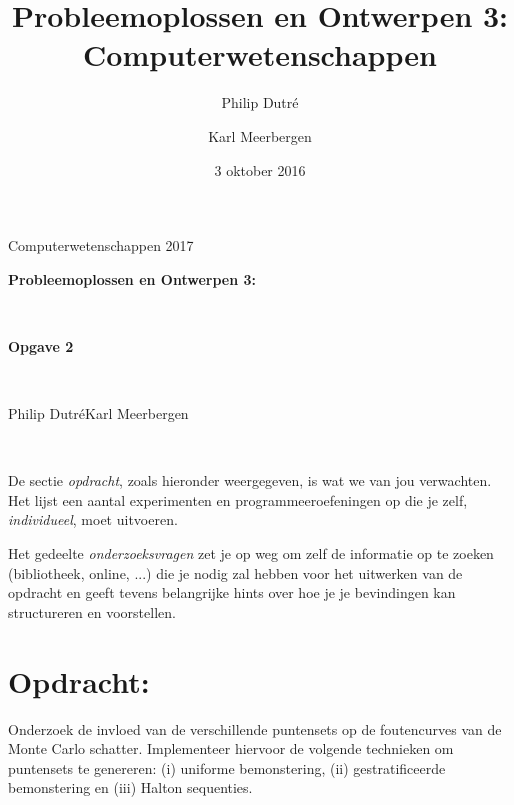\documentclass[10pt,a4paper]{article}
\title{Probleemoplossen en Ontwerpen 3: Computerwetenschappen}
\author{Philip Dutr\'e \and Karl Meerbergen}
\date{3 oktober 2016}
\begin{document}
\begin{flushright}
	Computerwetenschappen 2017\\[1cm]
\end{flushright}
\begin{center}%
	\begin{huge}
		\textbf{Probleemoplossen en Ontwerpen 3:}
	\end{huge}\\[0.25cm]
	\begin{huge}
		\textbf{\textemdash Opgave 2\textemdash}
	\end{huge}\\[0.75cm]
	\begin{large}
	Philip Dutr\'e\hspace{1cm}Karl Meerbergen
	\end{large}\\[0.75cm]
\end{center}

De sectie \emph{opdracht}, zoals hieronder weergegeven, is wat we van jou verwachten. Het lijst een aantal experimenten en programmeeroefeningen op die je zelf, \emph{individueel}, moet uitvoeren.

Het gedeelte \emph{onderzoeksvragen} zet je op weg om zelf de informatie op te zoeken (bibliotheek, online, ...) die je nodig zal hebben voor het uitwerken van de opdracht en geeft tevens belangrijke hints over hoe je je bevindingen kan structureren en voorstellen.

\section*{Opdracht:}

Onderzoek de invloed van de verschillende puntensets op de foutencurves van de Monte Carlo schatter. Implementeer hiervoor de volgende technieken om puntensets te genereren: (i) uniforme bemonstering, (ii) gestratificeerde bemonstering en (iii) Halton sequenties.
\end{document}
